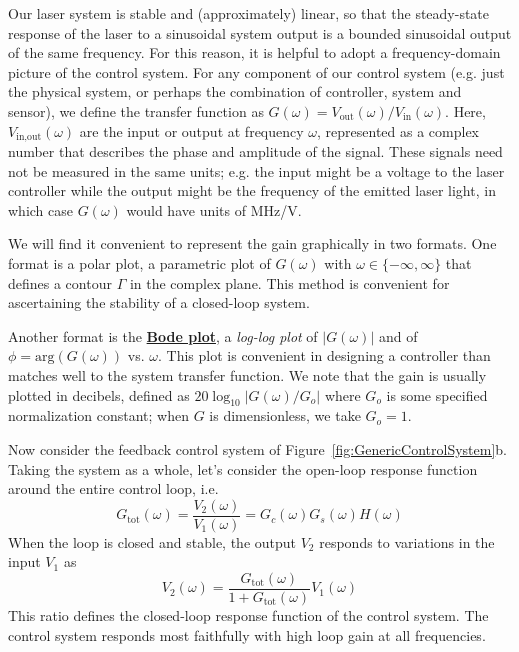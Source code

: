 \documentclass{../lab}
\begin{document}
Our laser system is stable and (approximately) linear, so that the steady-state response of the laser to a sinusoidal system output is a bounded sinusoidal output of the same frequency. For this reason, it is helpful to adopt a frequency-domain picture of the control system. For any component of our control system (e.g. just the physical system, or perhaps the combination of controller, system and sensor), we define the transfer function as $G(\omega) = V_\text{out}(\omega)/V_\text{in}(\omega)$. Here, $V_\text{in,out}(\omega)$ are the input or output at frequency $\omega$, represented as a complex number that describes the phase and amplitude of the signal. These signals need not be measured in the same units; e.g. the input might be a voltage to the laser controller while the output might be the frequency of the emitted laser light, in which case $ G(\omega)$ would have units of MHz/V.

We will find it convenient to represent the gain graphically in two formats. One format is a polar plot, a parametric plot of $G(\omega)$ with $\omega \in \{-\infty, \infty\}$ that defines a contour $\Gamma$ in the complex plane. This method is convenient for ascertaining the stability of a closed-loop system.

Another format is the \href{http://experimentationlab.berkeley.edu/sites/default/files/Definitions\%20for\%20MOT.pdf}{\textbf{Bode plot}}, a \emph{log-log plot} of $|G(\omega)|$ and of $\phi = \text{arg}(G(\omega) )$ vs. $\omega$. This plot is convenient in designing a controller than matches well to the system transfer function. We note that the gain is usually plotted in decibels, defined as $ 20\log_{10}|G(\omega)/G_o|$ where $G_o$ is some specified normalization constant; when $G$ is dimensionless, we take $G_o = 1$.

Now consider the feedback control system of Figure~\ref{fig:GenericControlSystem}b. Taking the system as a whole, let’s consider the open-loop response function around the entire control loop, i.e.
\begin{equation}
    G_\text{tot}(\omega) = \frac{V_2(\omega)}{V_1(\omega)} = G_c(\omega)G_s(\omega)H(\omega)
\end{equation}
When the loop is closed and stable, the output $V_2$ responds to variations in the input $V_1$ as
\begin{equation}
    V_2(\omega) = \frac{G_\text{tot}(\omega)}{1+G_\text{tot}(\omega)}V_1(\omega)
\end{equation}
This ratio defines the closed-loop response function of the control system. The control system responds most faithfully with high loop gain at all frequencies.
\end{document}
